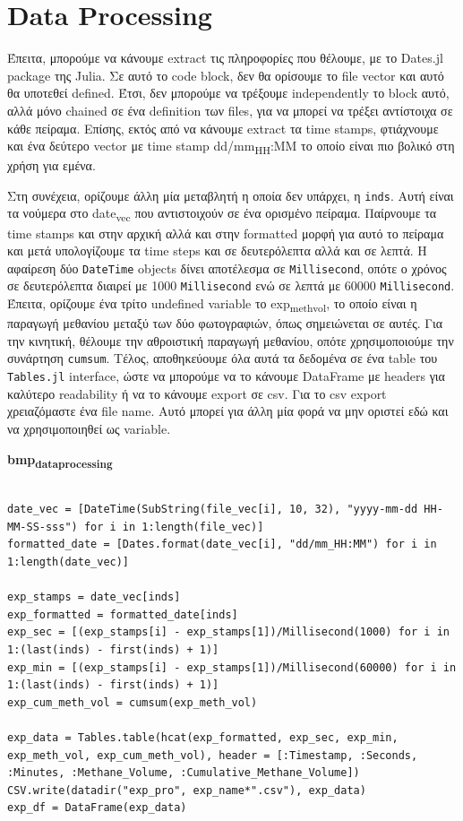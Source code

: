 \documentclass[11pt]{article}
\begin{document}
\section{Data Processing}
\label{sec:orga256dc0}
Έπειτα, μπορούμε να κάνουμε extract τις πληροφορίες που θέλουμε, με το Dates.jl package της Julia. Σε αυτό το code block, δεν θα ορίσουμε το file vector και αυτό θα υποτεθεί defined. Έτσι, δεν μπορούμε να τρέξουμε independently το block αυτό, αλλά μόνο chained σε ένα definition των files, για να μπορεί να τρέξει αντίστοιχα σε κάθε πείραμα. Επίσης, εκτός από να κάνουμε extract τα time stamps, φτιάχνουμε και ένα δεύτερο vector με time stamp dd/mm\textsubscript{HH}:MM το οποίο είναι πιο βολικό στη χρήση για εμένα.

Στη συνέχεια, ορίζουμε άλλη μία μεταβλητή η οποία δεν υπάρχει, η \texttt{inds}. Αυτή είναι τα νούμερα στο date\textsubscript{vec} που αντιστοιχούν σε ένα ορισμένο πείραμα. Παίρνουμε τα time stamps και στην αρχική αλλά και στην formatted μορφή για αυτό το πείραμα και μετά υπολογίζουμε τα time steps και σε δευτερόλεπτα αλλά και σε λεπτά. Η αφαίρεση δύο \texttt{DateTime} objects δίνει αποτέλεσμα σε \texttt{Millisecond}, οπότε ο χρόνος σε δευτερόλεπτα διαιρεί με 1000 \texttt{Millisecond} ενώ σε λεπτά με 60000 \texttt{Millisecond}. Έπειτα, ορίζουμε ένα τρίτο undefined variable το exp\textsubscript{meth}\textsubscript{vol}, το οποίο είναι η παραγωγή μεθανίου μεταξύ των δύο φωτογραφιών, όπως σημειώνεται σε αυτές. Για την κινητική, θέλουμε την αθροιστική παραγωγή μεθανίου, οπότε χρησιμοποιούμε την συνάρτηση \texttt{cumsum}. Τέλος, αποθηκεύουμε όλα αυτά τα δεδομένα σε ένα table του \texttt{Tables.jl} interface, ώστε να μπορούμε να το κάνουμε DataFrame με headers για καλύτερο readability ή να το κάνουμε export σε csv. Για το csv export χρειαζόμαστε ένα file name. Αυτό μπορεί για άλλη μία φορά να μην οριστεί εδώ και να χρησιμοποιηθεί ως variable.

\textbf{bmp\textsubscript{data}\textsubscript{processing}}
\begin{verbatim}

date_vec = [DateTime(SubString(file_vec[i], 10, 32), "yyyy-mm-dd HH-MM-SS-sss") for i in 1:length(file_vec)]
formatted_date = [Dates.format(date_vec[i], "dd/mm_HH:MM") for i in 1:length(date_vec)]

exp_stamps = date_vec[inds]
exp_formatted = formatted_date[inds]
exp_sec = [(exp_stamps[i] - exp_stamps[1])/Millisecond(1000) for i in 1:(last(inds) - first(inds) + 1)]
exp_min = [(exp_stamps[i] - exp_stamps[1])/Millisecond(60000) for i in 1:(last(inds) - first(inds) + 1)]
exp_cum_meth_vol = cumsum(exp_meth_vol)

exp_data = Tables.table(hcat(exp_formatted, exp_sec, exp_min, exp_meth_vol, exp_cum_meth_vol), header = [:Timestamp, :Seconds, :Minutes, :Methane_Volume, :Cumulative_Methane_Volume])
CSV.write(datadir("exp_pro", exp_name*".csv"), exp_data)
exp_df = DataFrame(exp_data)

\end{verbatim}
\end{document}
